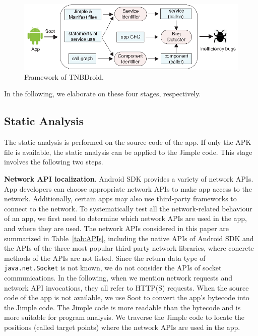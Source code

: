 \documentclass[sigconf,review, anonymous]{acmart}
\begin{document}
\begin{figure}
 \centering
  \includegraphics[scale=0.6]{framework.eps}
  \caption{Framework of \textsf{TNBDroid}.}
  \label{fig_framework}
\end{figure}

In the following, we elaborate on these four stages, respectively. 


\subsection{Static Analysis}\label{sub_staticanalysis}
The static analysis is performed on the source code of the app. If only the APK file is available, the static analysis can be applied to the Jimple code. This stage involves the following two steps.

\textbf{Network API localization}. Android SDK provides a variety of network APIs. App developers can choose appropriate network APIs to make app access to the network. Additionally, certain apps may also use third-party frameworks to connect to the network. To systematically test all the network-related behaviour of an app, we first need to determine which network APIs are used in the app, and where they are used. The network APIs considered in this paper are summarized in Table~\ref{tab:APIs}, including the native APIs of Android SDK and the APIs of the three most popular third-party network libraries, where concrete methods of the APIs are not listed. Since the return data type of \texttt{java.net.Socket} is not known, we do not consider the APIs of socket communications. In the following, when we mention network requests and network API invocations, they all refer to HTTP(S) requests. When the source code of the app is not available, we use \textsf{Soot} to convert the app's bytecode into the Jimple code. The Jimple code is more readable than the bytecode and is more suitable for program analysis. We traverse the Jimple code to locate the positions (called target points) where the network APIs are used in the app.
\end{document}
